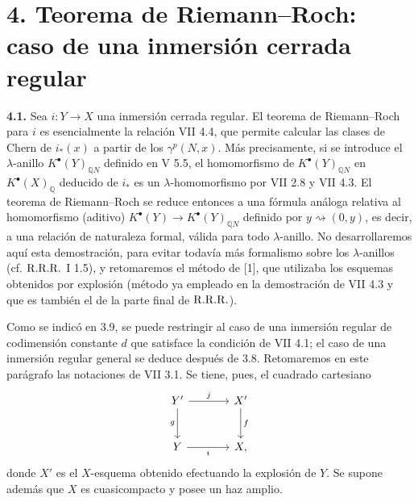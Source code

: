 
\section*{4. Teorema de Riemann--Roch: caso de una inmersión cerrada regular}

\textbf{4.1.} Sea \(i:Y\to X\) una inmersión cerrada regular. El teorema de
Riemann--Roch para \(i\) es esencialmente la relación VII 4.4, que permite
calcular las clases de Chern de \(i_*(x)\) a partir de los \(\gamma^p(N,x)\).
Más precisamente, si se introduce el \(\lambda\)-anillo
\(K^{\bullet}(Y)_{\mathbb Q N}\) definido en V 5.5, el homomorfismo de
\(K^{\bullet}(Y)_{\mathbb Q N}\) en \(K^{\bullet}(X)_{\mathbb Q}\) deducido de
\(i_*\) es un \(\lambda\)-homomorfismo por VII 2.8 y VII 4.3. El teorema de
Riemann--Roch se reduce entonces a una fórmula análoga relativa al homomorfismo
(aditivo) \(K^{\bullet}(Y)\longrightarrow K^{\bullet}(Y)_{\mathbb Q N}\)
definido por \(y\rightsquigarrow(0,y)\), es decir, a una relación de naturaleza
formal, válida para todo \(\lambda\)-anillo. No desarrollaremos aquí esta
demostración, para evitar todavía más formalismo sobre los \(\lambda\)-anillos
(cf. \(\mathrm{R.R.R.}\) I 1.5), y retomaremos el método de [1], que utilizaba los esquemas
obtenidos por explosión (método ya empleado en la demostración de VII 4.3 y que
es también el de la parte final de \(\mathrm{R.R.R.}\)).

Como se indicó en 3.9, se puede restringir al caso de una inmersión regular de
codimensión constante \(d\) que satisface la condición de VII 4.1; el caso de
una inmersión regular general se deduce después de 3.8. Retomaremos en este
parágrafo las notaciones de VII 3.1. Se tiene, pues, el cuadrado cartesiano
\[
\begin{tikzcd}[column sep=large,row sep=large]
Y' \arrow[r,"j"] \arrow[d,"g"'] & X' \arrow[d,"f"]\\
Y \arrow[r,"i"'] & X ,
\end{tikzcd}
\]
donde \(X'\) es el \(X\)-esquema obtenido efectuando la explosión de \(Y\). Se
supone además que \(X\) es cuasicompacto y posee un haz amplio.

